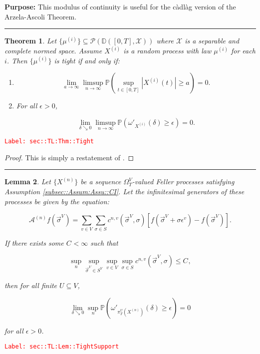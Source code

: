 \documentclass[12pt]{article}
\newcommand{\mb}{\mathbb}
\newcommand{\mc}{\mathcal}
\newcommand{\ra}{\rightarrow}
\newcommand{\ep}{\epsilon}
\newcommand{\tr}{\textcolor{red}}
\newcommand{\labe}[1]{\tr{\texttt{Label: #1}}}
\newcommand{\purpose}{\textbf{Purpose: }}
\newcommand{\lin}{\rule{\linewidth}{0.4 pt}}
\newcommand{\pr}{\mb{P}}							%
\newcommand{\cad}{\mb{D}}							%
\renewcommand{\v}{v}							%
\renewcommand{\U}{U}							%
\renewcommand{\S}{S}							%
\newcommand{\s}{\sigma}							%
\newcommand{\sv}{\vec{\s}}						%
\newcommand{\ev}{\ep}							%
\newcommand{\T}{T}								%
\renewcommand{\t}{t}							%
\newcommand{\sset}{\Omega}						%
\newcommand{\proj}{\pi}							%
\newcommand{\X}{X}								%
\newcommand{\IG}{\mc{A}}						%
\newcommand{\IGr}{c}							%
\newcommand{\vind}[1]{^{#1}}					%
\newcommand{\carp}[1]{^{#1}}					%
\newcommand{\vsi}[1]{^{#1}}						%
\newcommand{\cind}[1]{_{#1}}					%
\newcommand{\tp}[1]{(#1)}						%
\newcommand{\tip}[1]{#1}						%
\newcommand{\ts}[1]{_{#1}}						%
\newcommand{\slnvind}[2]{^{#1,#2}}				%
\newcommand{\const}{C}							%
\newcommand{\sln}[1]{^{(#1)}}						%
\newcommand{\cmodu}{\omega'}					%
\newcommand{\pra}[1]{_{#1}}						%
\newcommand{\indx}[1]{_{#1}}					%
\newcommand{\m}{\mu}							%
\newcommand{\spce}{\mc{X}}						%
\newtheorem{thms}{Theorem}[section]
\newtheorem{lem}[thms]{Lemma}
\begin{document}
\purpose This modulus of continuity is useful for the c\`adl\`ag version of the Arzela-Ascoli Theorem.

\lin

\begin{thms}
Let \(\{\m\sln{i}\}\subseteq \mc{P}\left(\cad([0,T],\spce)\right)\) where \(\spce\) is a separable and complete normed space. Assume \(\X\sln{i}\) is a random process with law \(\m\sln{i}\) for each \(i\). Then \(\{\m\sln{i}\}\) is tight if and only if:

\begin{enumerate}[(1)]
\item 

\[\lim_{a \ra \infty}\limsup_{n \ra\infty} \pr\left(\sup_{\t \in [0,T]} |\X\sln{i}\tp{\t}| \geq a\right) = 0.\]

\item For all \(\ep > 0\),

\[\lim_{\delta \searrow 0}\limsup_{n\ra\infty} \pr\left(\cmodu\pra{\X\sln{i}}(\delta) \geq \ep\right) = 0.\]
\end{enumerate}
\label{sec::TL:Thm::Tight}
\end{thms}
\labe{sec::TL:Thm::Tight}

\begin{proof}
This is simply a restatement of \cite[Theorem 13.2]{Bil99}.
\end{proof}

\lin

\begin{lem}
Let \(\{\X\sln{n}\cind{}\tip{}\}\) be a sequence \(\sset\vsi{V}\ts{\T}\)-valued Feller processes satisfying Assumption \ref{subsec::Assum:Assu::CI}. Let the infinitesimal generators of these processes be given by the equation:

\[\IG\sln{n}f(\sv\cind{}\vsi{V}) = \sum_{\v\in V}\sum_{\s \in \S} \IGr\slnvind{n}{\v}(\sv\cind{}\vsi{V},\s)[f(\sv\cind{}\vsi{V} + \s\ev\vind{\v}) - f(\sv\cind{}\vsi{V})].\]

If there exists some \(\const\indx{} < \infty\) such that

\[\sup_{n}\sup_{\sv\cind{}\vsi{V}\in \S\carp{V}}\sup_{\v\in V}\sup_{\s\in \S} \IGr\slnvind{n}{\v}(\sv\cind{}\vsi{V},\s) \leq \const\indx{},\]

then for all finite \(\U \subseteq V\),

\[\lim_{\delta \searrow 0} \sup_n \pr\left(\cmodu\pra{\proj\vsi{\U}\ts{\T}\left(\X\sln{n}\cind{}\tip{}\right)}(\delta) \geq \ep\right) = 0\]

for all \(\ep > 0\).
\label{sec::TL:Lem::TightSupport}
\end{lem}
\labe{sec::TL:Lem::TightSupport}
\end{document}
